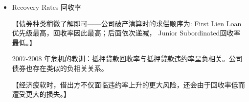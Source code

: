 \begin{itemize}
\begin{itemize}
\begin{itemize}
        例如：假设每年的风险率是恒定的 1.5\%。
        
        第一年年底发生违约的概率是 \(1 - {\mathrm{e}}^{-{0.015} \times  1} = {0.0149}\) 。
        
        到第二年年底发生违约的概率是 \(1 - {\mathrm{e}}^{-{0.015} \times  2} = {0.0296}\)
        
        在第三年、第四年和第五年结束时发生违约的概率分别为0.0440， 0.0582， 和0.0723
        
        
         第四年的无条件违约概率为\({0.0582} - {0.0440} = {0.0142}\) 
        
         在没有提前违约的条件下，第四年违约的概率为 0.0142/(1- 0.0440) = 0.0149
        
        \item Recovery Rates 回收率
        

        \begin{table}[htbp]
            \centering
            \caption{1983 到 2021 不同公司债券种类的回收率}
        \end{table}
        
        【债券种类稍微了解即可——公司破产清算时的求偿顺序为: First Lien Loan优先级最高，回收率因此最高；后面依次递减， Junior Subordinated回收率最低。】 
        
        2007-2008 年危机的教训：抵押贷款回收率与抵押贷款违约率呈负相关。公司债券也存在类似的负相关关系。
        
    【经济疲软时，借出方不仅面临违约率上升的更大风险，还会由于回收率低而遭受更大的损失。】

    \end{itemize}
\end{itemize}

\end{itemize}


